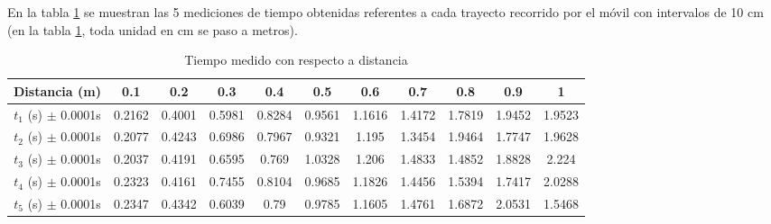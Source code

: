 \documentclass{article}
\begin{document}
En la tabla \ref{Tabla:1} se muestran las 5 mediciones de tiempo obtenidas referentes a cada trayecto recorrido por el móvil con intervalos de 10 cm (en la tabla \ref{Tabla:1}, toda unidad en cm se paso a metros).
\begin{table}[H]
	\centering
	\begin{tabular}{|c|c|c|c|c|c|c|c|c|c|c|}
	\hline
	Distancia (m) & 0.1 & 0.2 & 0.3 & 0.4 & 0.5 & 0.6 & 0.7 & 0.8 & 0.9 & 1 \\
	\hline
	$t_1$ (s) $\pm$ 0.0001s & 0.2162 & 0.4001 & 0.5981 & 0.8284 & 0.9561 & 1.1616 & 1.4172 & 1.7819 & 1.9452 & 1.9523 \\
	\hline
	$t_2$ (s) $\pm$ 0.0001s & 0.2077 & 0.4243 & 0.6986 & 0.7967 & 0.9321 & 1.195 & 1.3454 & 1.9464 & 1.7747 & 1.9628 \\
	\hline
	$t_3$ (s) $\pm$ 0.0001s & 0.2037 & 0.4191 & 0.6595 & 0.769 & 1.0328 & 1.206 & 1.4833 & 1.4852 & 1.8828 & 2.224 \\
	\hline
	$t_4$ (s) $\pm$ 0.0001s & 0.2323 & 0.4161 & 0.7455 & 0.8104 & 0.9685 & 1.1826 & 1.4456 & 1.5394 & 1.7417 & 2.0288 \\
	\hline
	$t_5$ (s) $\pm$ 0.0001s & 0.2347 & 0.4342 & 0.6039 & 0.79 & 0.9785 & 1.1605 & 1.4761 & 1.6872 & 2.0531 & 1.5468 \\
	\hline
	\end{tabular}
	\caption{Tiempo medido con respecto a distancia}
	\label{Tabla:1}
\end{table}


\end{document}
